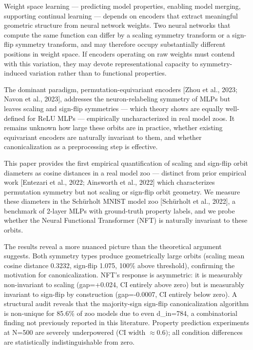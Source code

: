 
Weight space learning --- predicting model properties, enabling model merging, supporting continual learning --- depends on encoders that extract meaningful geometric structure from neural network weights. Two neural networks that compute the same function can differ by a scaling symmetry transform or a sign-flip symmetry transform, and may therefore occupy substantially different positions in weight space. If encoders operating on raw weights must contend with this variation, they may devote representational capacity to symmetry-induced variation rather than to functional properties.

The dominant paradigm, permutation-equivariant encoders [Zhou et al., 2023; Navon et al., 2023], addresses the neuron-relabeling symmetry of MLPs but leaves scaling and sign-flip symmetries --- which theory shows are equally well-defined for ReLU MLPs \citep{Navon2023EquivariantArchitectures} --- empirically uncharacterized in real model zoos. It remains unknown how large these orbits are in practice, whether existing equivariant encoders are naturally invariant to them, and whether canonicalization as a preprocessing step is effective.

This paper provides the first empirical quantification of scaling and sign-flip orbit diameters as cosine distances in a real model zoo --- distinct from prior empirical work [Entezari et al., 2022; Ainsworth et al., 2022] which characterizes permutation symmetry but not scaling or sign-flip orbit geometry. We measure these diameters in the Schürholt MNIST model zoo [Schürholt et al., 2022], a benchmark of 2-layer MLPs with ground-truth property labels, and we probe whether the Neural Functional Transformer (NFT) \citep{Zhou2023NeuralFunctionalNetworks} is naturally invariant to these orbits.

The results reveal a more nuanced picture than the theoretical argument suggests. Both symmetry types produce geometrically large orbits (scaling mean cosine distance 0.3232, sign-flip 1.075, 100\% above threshold), confirming the motivation for canonicalization. NFT's response is asymmetric: it is measurably non-invariant to scaling (gap=+0.024, CI entirely above zero) but is measurably invariant to sign-flip by construction (gap=-0.0007, CI entirely below zero). A structural audit reveals that the majority-sign sign-flip canonicalization algorithm is non-unique for 85.6\% of zoo models due to even d\_in=784, a combinatorial finding not previously reported in this literature. Property prediction experiments at N=500 are severely underpowered (CI width $\approx 0.6)$; all condition differences are statistically indistinguishable from zero.

